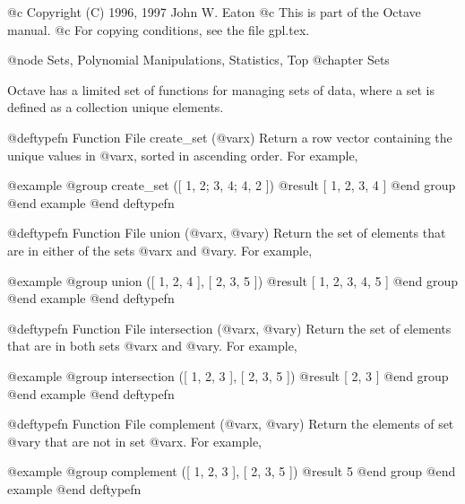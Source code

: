 @c Copyright (C) 1996, 1997 John W. Eaton
@c This is part of the Octave manual.
@c For copying conditions, see the file gpl.tex.

@node Sets, Polynomial Manipulations, Statistics, Top
@chapter Sets

Octave has a limited set of functions for managing sets of data, where a
set is defined as a collection unique elements.

@deftypefn {Function File} {} create_set (@var{x})
Return a row vector containing the unique values in @var{x}, sorted in
ascending order.  For example,

@example
@group
create_set ([ 1, 2; 3, 4; 4, 2 ])
     @result{} [ 1, 2, 3, 4 ]
@end group
@end example
@end deftypefn

@deftypefn {Function File} {} union (@var{x}, @var{y})
Return the set of elements that are in either of the sets @var{x} and
@var{y}.  For example,

@example
@group
union ([ 1, 2, 4 ], [ 2, 3, 5 ])
     @result{} [ 1, 2, 3, 4, 5 ]
@end group
@end example
@end deftypefn

@deftypefn {Function File} {} intersection (@var{x}, @var{y})
Return the set of elements that are in both sets @var{x} and @var{y}.
For example,

@example
@group
intersection ([ 1, 2, 3 ], [ 2, 3, 5 ])
     @result{} [ 2, 3 ]
@end group
@end example
@end deftypefn

@deftypefn {Function File} {} complement (@var{x}, @var{y})
Return the elements of set @var{y} that are not in set @var{x}.  For
example,

@example
@group
complement ([ 1, 2, 3 ], [ 2, 3, 5 ])
     @result{} 5
@end group
@end example
@end deftypefn
